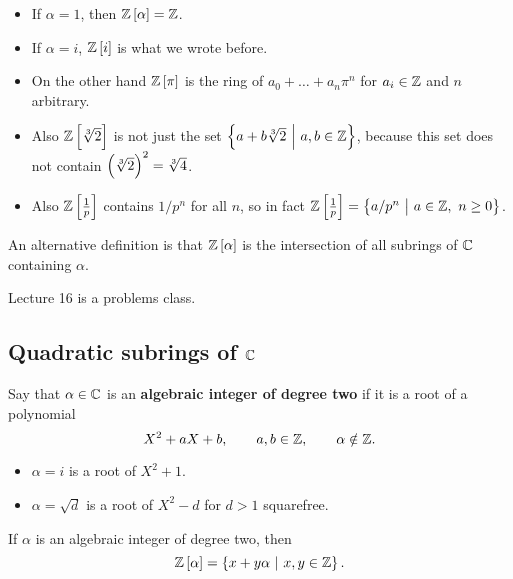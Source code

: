 \begin{example*}
\hfill
\begin{itemize}
\item If $ \alpha = 1 $, then $ \ZZ\sbr{\alpha} = \ZZ $.
\item If $ \alpha = i $, $ \ZZ\sbr{i} $ is what we wrote before.
\item On the other hand $ \ZZ\sbr{\pi} $ is the ring of $ a_0 + \dots + a_n\pi^n $ for $ a_i \in \mathbb{Z} $ and $ n $ arbitrary.
\item Also $ \ZZ\sbr{\sqrt[3]{2}} $ is not just the set $ \cbr{a + b\sqrt[3]{2} \st a, b \in \ZZ} $, because this set does not contain $ \br{\sqrt[3]{2}}^2 = \sqrt[3]{4} $.
\item Also $ \ZZ\sbr{\tfrac{1}{p}} $ contains $ 1 / p^n $ for all $ n $, so in fact $ \ZZ\sbr{\tfrac{1}{p}} = \cbr{a / p^n \st a \in \ZZ, \ n \ge 0} $.
\end{itemize}
\end{example*}

An alternative definition is that $ \ZZ\sbr{\alpha} $ is the intersection of all subrings of $ \mathbb{C} $ containing $ \alpha $.


Lecture 16 is a problems class.

\subsection{Quadratic subrings of \texorpdfstring{$ \mathbb{C} $}{C}}


\begin{definition}
Say that $ \alpha \in \mathbb{C} $ is an \textbf{algebraic integer of degree two} if it is a root of a polynomial
$$ X^2 + aX + b, \qquad a, b \in \mathbb{Z}, \qquad \alpha \notin \mathbb{Z}. $$
\end{definition}

\begin{example*}
\hfill
\begin{itemize}
\item $ \alpha = i $ is a root of $ X^2 + 1 $.
\item $ \alpha = \sqrt{d} $ is a root of $ X^2 - d $ for $ d > 1 $ squarefree.
\end{itemize}
\end{example*}

\begin{proposition}
If $ \alpha $ is an algebraic integer of degree two, then
$$ \ZZ\sbr{\alpha} = \cbr{x + y\alpha \st x, y \in \ZZ}. $$
\end{proposition}

